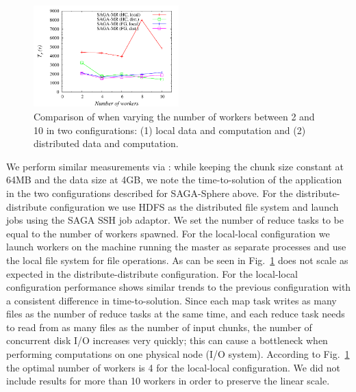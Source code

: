 \documentclass[3p,twocolumn]{elsarticle}
\begin{document}
\begin{figure}[htb!]
 \dnnn\dnnn
 \includegraphics[width=0.5\textwidth]{figures/sagamr_varying_workers.pdf}
 \caption{
   Comparison of \sagamapreduce when varying the number of workers
   between 2 and 10 in two configurations: (1) local data and computation
   and (2) distributed data and computation.
   \label{fig:sagamr_varying_workers}
   }
\end{figure}

We perform similar measurements via \sagamapreduce: while keeping the
chunk size constant at 64MB and the data size at 4GB, we note the
time-to-solution of the \wc application in the two configurations
described for SAGA-Sphere above.  For the distribute-distribute
configuration we use HDFS as the distributed file system and launch
jobs using the SAGA SSH job adaptor.  We set the number of reduce tasks
to be equal to the number of workers spawned.
 For the local-local configuration we launch
workers on the machine running the master as separate processes and
use the local file system for file operations.  As can be seen in
Fig.~\ref{fig:sagamr_varying_workers} \sagamapreduce does not scale as
expected in the distribute-distribute configuration.  
For the local-local configuration performance shows similar trends to the
previous configuration with a consistent difference in time-to-solution.
Since each map task writes as many files as the number of
reduce tasks at the same time, and each reduce task needs to read from
as many files as the number of input chunks, the number of concurrent
disk I/O increases very quickly; this can cause a
bottleneck when performing computations on one physical node (I/O
system).  According to Fig.~\ref{fig:sagamr_varying_workers} the
optimal number of workers is 4 for the local-local configuration.  We
did not include results for more than 10 workers in order to preserve
the linear
scale. %
\end{document}
